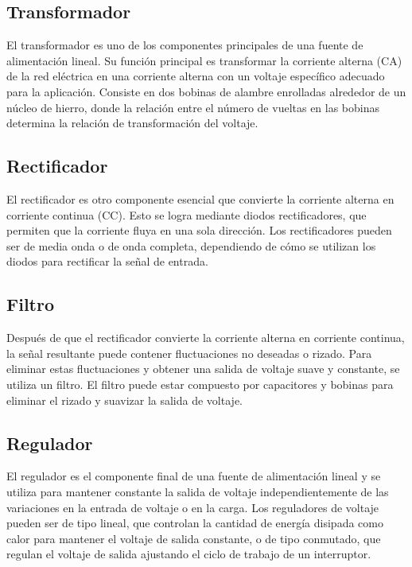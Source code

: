 \subsection{Transformador}
El transformador es uno de los componentes principales de una fuente de alimentación lineal. Su función principal es transformar la corriente alterna (CA) de la red eléctrica en una corriente alterna con un voltaje específico adecuado para la aplicación. Consiste en dos bobinas de alambre enrolladas alrededor de un núcleo de hierro, donde la relación entre el número de vueltas en las bobinas determina la relación de transformación del voltaje.

\subsection{Rectificador}
El rectificador es otro componente esencial que convierte la corriente alterna en corriente continua (CC). Esto se logra mediante diodos rectificadores, que permiten que la corriente fluya en una sola dirección. Los rectificadores pueden ser de media onda o de onda completa, dependiendo de cómo se utilizan los diodos para rectificar la señal de entrada.

\subsection{Filtro}
Después de que el rectificador convierte la corriente alterna en corriente continua, la señal resultante puede contener fluctuaciones no deseadas o rizado. Para eliminar estas fluctuaciones y obtener una salida de voltaje suave y constante, se utiliza un filtro. El filtro puede estar compuesto por capacitores y bobinas para eliminar el rizado y suavizar la salida de voltaje.

\subsection{Regulador}
El regulador es el componente final de una fuente de alimentación lineal y se utiliza para mantener constante la salida de voltaje independientemente de las variaciones en la entrada de voltaje o en la carga. Los reguladores de voltaje pueden ser de tipo lineal, que controlan la cantidad de energía disipada como calor para mantener el voltaje de salida constante, o de tipo conmutado, que regulan el voltaje de salida ajustando el ciclo de trabajo de un interruptor.

